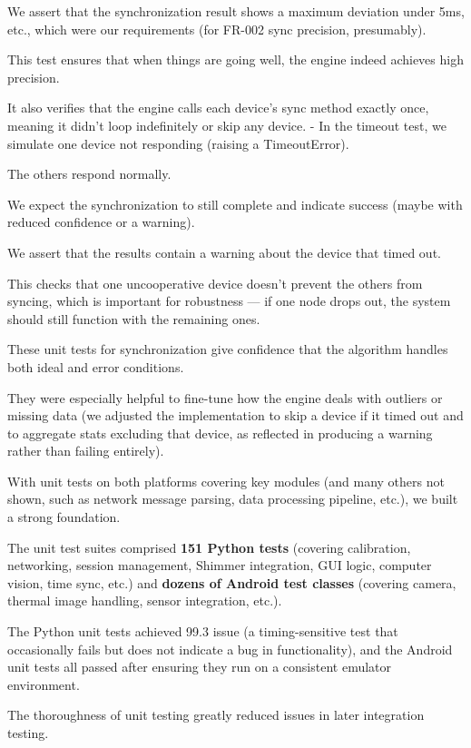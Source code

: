 {{We assert that the synchronization result shows a maximum deviation under 5ms, etc.,
which were our requirements (for FR-002 sync precision, presumably).

This test ensures that when things are going well, the engine indeed achieves high
precision.

It also verifies that the engine calls each device's sync method exactly once,
meaning it didn't loop indefinitely or skip any device.  - In the timeout test, we
simulate one device not responding (raising a TimeoutError).

The others respond normally.

We expect the synchronization to still complete and indicate success (maybe with
reduced confidence or a warning).

We assert that the results contain a warning about the device that timed out.

This checks that one uncooperative device doesn't prevent the others from syncing,
which is important for robustness --- if one node drops out, the system should still
function with the remaining ones.

These unit tests for synchronization give confidence that the algorithm handles both
ideal and error conditions.

They were especially helpful to fine-tune how the engine deals with outliers or
missing data (we adjusted the implementation to skip a device if it timed out and to
aggregate stats excluding that device, as reflected in producing a warning rather
than failing entirely).

With unit tests on both platforms covering key modules (and many others not shown,
such as network message parsing, data processing pipeline, etc.), we built a strong
foundation.

The unit test suites comprised \textbf{151 Python tests}
 (covering calibration, networking, session management, Shimmer integration, GUI
 logic, computer vision, time sync, etc.) and \textbf{dozens of Android test classes}
 (covering camera, thermal image handling, sensor integration, etc.).

The Python unit tests achieved 99.3%
issue (a timing-sensitive test that occasionally fails but does not indicate a bug in
functionality), and the Android unit tests all passed after ensuring they run on a
consistent emulator environment.

The thoroughness of unit testing greatly reduced issues in later integration testing.

}}

